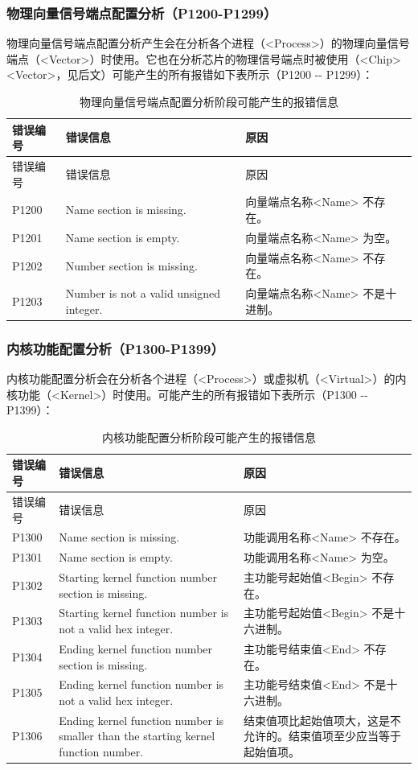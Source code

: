 \subsubsection{物理向量信号端点配置分析（P1200-P1299）}\label{subsubsec:5-6-2-13}

物理向量信号端点配置分析产生会在分析各个进程（<Process>）的物理向量信号端点（<Vector>）时使用。它也在分析芯片的物理信号端点时被使用（<Chip><Vector>，见后文）可能产生的所有报错如下表所示（P1200
-\/- P1299）：

\begin{xltabular}{\textwidth}{@{}>{\hsize\raggedright\arraybackslash}X>{\hsize\raggedright\arraybackslash}X>{\hsize\raggedright\arraybackslash}X@{}}
\caption{物理向量信号端点配置分析阶段可能产生的报错信息}\label{tab:5-15}\\
\toprule
错误编号 & 错误信息 & 原因\tabularnewline
\endfirsthead
\toprule
错误编号 & 错误信息 & 原因\tabularnewline
\midrule
\endhead
\bottomrule
\endlastfoot
P1200 & Name section is missing. &
向量端点名称<Name> 不存在。\tabularnewline
P1201 & Name section is empty. &
向量端点名称<Name> 为空。\tabularnewline
P1202 & Number section is missing. &
向量端点名称<Name> 不存在。\tabularnewline
P1203 & Number is not a valid unsigned integer. &
向量端点名称<Name> 不是十进制。\tabularnewline
\end{xltabular}

\subsubsection{内核功能配置分析（P1300-P1399）}\label{subsubsec:5-6-2-14}

内核功能配置分析会在分析各个进程（<Process>）或虚拟机（<Virtual>）的内核功能（<Kernel>）时使用。可能产生的所有报错如下表所示（P1300
-\/- P1399）：

\begin{xltabular}{\textwidth}{@{}>{\hsize\raggedright\arraybackslash}X>{\hsize\raggedright\arraybackslash}X>{\hsize\raggedright\arraybackslash}X@{}}
\caption{内核功能配置分析阶段可能产生的报错信息}\label{tab:5-16}\\
\toprule
错误编号 & 错误信息 & 原因\tabularnewline
\endfirsthead
\toprule
错误编号 & 错误信息 & 原因\tabularnewline
\midrule
\endhead
\bottomrule
\endlastfoot
P1300 & Name section is missing. &
功能调用名称<Name> 不存在。\tabularnewline
P1301 & Name section is empty. &
功能调用名称<Name> 为空。\tabularnewline
P1302 & Starting kernel function number section is missing. &
主功能号起始值<Begin> 不存在。\tabularnewline
P1303 & Starting kernel function number is not a valid hex integer. &
主功能号起始值<Begin> 不是十六进制。\tabularnewline
P1304 & Ending kernel function number section is missing. &
主功能号结束值<End> 不存在。\tabularnewline
P1305 & Ending kernel function number is not a valid hex integer. &
主功能号结束值<End> 不是十六进制。\tabularnewline
P1306 & Ending kernel function number is smaller than the starting
kernel function number. &
结束值项比起始值项大，这是不允许的。结束值项至少应当等于起始值项。\tabularnewline
\end{xltabular}

